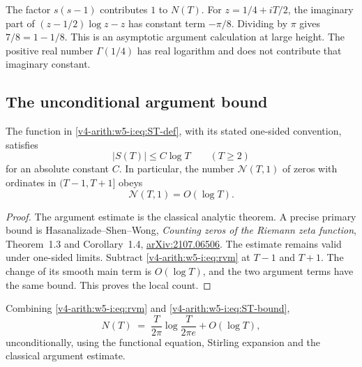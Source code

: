 \begin{remark}
\label{v4-arith:w5-i:rem:78}
The factor \(s(s-1)\) contributes \(1\) to \(N(T)\).
For \(z=1/4+iT/2\), the imaginary part of
\((z-1/2)\log z-z\) has constant term \(-\pi/8\).
Dividing by \(\pi\) gives \(7/8=1-1/8\).
This is an asymptotic argument calculation at large height.
The positive real number \(\Gamma(1/4)\) has real logarithm and does
not contribute that imaginary constant.
\end{remark}

\subsection{The unconditional argument bound}
\label{v4-arith:w5-i:ST-bound}

\begin{theorem}
\label{v4-arith:w5-i:thm:ST-bound}
The function in \eqref{v4-arith:w5-i:eq:ST-def}, with its stated
one-sided convention, satisfies
\begin{equation}
\label{v4-arith:w5-i:eq:ST-bound}
 |S(T)|\le C\log T\qquad(T\ge2)
\end{equation}
for an absolute constant \(C\). In particular, the number
\(\mathcal N(T,1)\) of zeros with ordinates in \((T-1,T+1]\) obeys
\begin{equation}
\label{v4-arith:w5-i:eq:jensen-count}
 \mathcal N(T,1)=O(\log T).
\end{equation}
\end{theorem}
\begin{proof}
The argument estimate is the classical analytic theorem.
A precise primary bound is Hasanalizade--Shen--Wong,
\emph{Counting zeros of the Riemann zeta function},
Theorem~1.3 and Corollary~1.4,
\href{https://arxiv.org/abs/2107.06506}{arXiv:2107.06506}.
The estimate remains valid under one-sided limits.
Subtract \eqref{v4-arith:w5-i:eq:rvm} at \(T-1\) and \(T+1\).
The change of its smooth main term is \(O(\log T)\), and the two
argument terms have the same bound. This proves the local count.
\end{proof}

\begin{corollary}
\label{v4-arith:w5-i:cor:NT-sharp}
Combining \eqref{v4-arith:w5-i:eq:rvm} and
\eqref{v4-arith:w5-i:eq:ST-bound},
\begin{equation}
\label{v4-arith:w5-i:eq:NT-main-error}
N(T)\;=\;\frac{T}{2\pi}\log\!\frac{T}{2\pi e}+O(\log T),
\end{equation}
unconditionally, using the functional equation, Stirling expansion
and the classical argument estimate.
\end{corollary}

